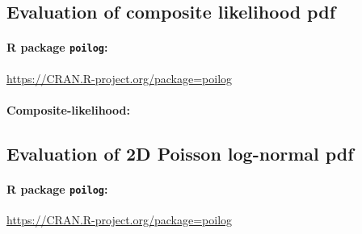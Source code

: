 \subsection{Evaluation of composite likelihood pdf}

\paragraph{R package {\tt poilog}: }
\url{https://CRAN.R-project.org/package=poilog}

\paragraph{Composite-likelihood: }

\subsection{Evaluation of 2D Poisson log-normal pdf}

\paragraph{R package {\tt poilog}: }
\url{https://CRAN.R-project.org/package=poilog}

